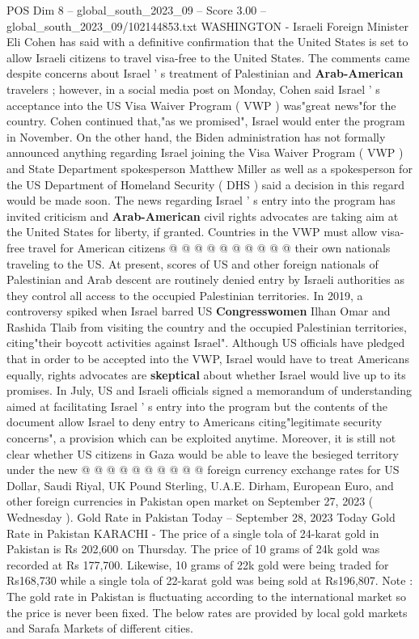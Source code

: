 \begin{textsample}{POS Dim 8 – global\_south\_2023\_09 – Score 3.00 – global\_south\_2023\_09/102144853.txt}  \label{ex:f8_pos_132}
WASHINGTON - Israeli Foreign Minister Eli Cohen has said with a definitive confirmation that the United States is set to allow Israeli citizens to travel visa-free to the United States.
The comments came despite concerns about Israel ' s treatment of Palestinian and \textbf{Arab-American} travelers ; however, in a social media post on Monday, Cohen said Israel ' s acceptance into the US Visa Waiver Program ( VWP ) was"great news"for the country.
Cohen continued that,"as we promised", Israel would enter the program in November.
On the other hand, the Biden administration has not formally announced anything regarding Israel joining the Visa Waiver Program ( VWP ) and State Department spokesperson Matthew Miller as well as a spokesperson for the US Department of Homeland Security ( DHS ) said a decision in this regard would be made soon.
The news regarding Israel ' s entry into the program has invited criticism and \textbf{Arab-American} civil rights advocates are taking aim at the United States for liberty, if granted.
Countries in the VWP must allow visa-free travel for American citizens @ @ @ @ @ @ @ @ @ @ their own nationals traveling to the US.
At present, scores of US and other foreign nationals of Palestinian and Arab descent are routinely denied entry by Israeli authorities as they control all access to the occupied Palestinian territories.
In 2019, a controversy spiked when Israel barred US \textbf{Congresswomen} Ilhan Omar and Rashida Tlaib from visiting the country and the occupied Palestinian territories, citing"their boycott activities against Israel".
Although US officials have pledged that in order to be accepted into the VWP, Israel would have to treat Americans equally, rights advocates are \textbf{skeptical} about whether Israel would live up to its promises.
In July, US and Israeli officials signed a memorandum of understanding aimed at facilitating Israel ' s entry into the program but the contents of the document allow Israel to deny entry to Americans citing"legitimate security concerns", a provision which can be exploited anytime.
Moreover, it is still not clear whether US citizens in Gaza would be able to leave the besieged territory under the new @ @ @ @ @ @ @ @ @ @ foreign currency exchange rates for US Dollar, Saudi Riyal, UK Pound Sterling, U.A.E.
Dirham, European Euro, and other foreign currencies in Pakistan open market on September 27, 2023 ( Wednesday ).
Gold Rate in Pakistan Today -- September 28, 2023 Today Gold Rate in Pakistan KARACHI - The price of a single tola of 24-karat gold in Pakistan is Rs 202,600 on Thursday.
The price of 10 grams of 24k gold was recorded at Rs 177,700.
Likewise, 10 grams of 22k gold were being traded for Rs168,730 while a single tola of 22-karat gold was being sold at Rs196,807.
Note : The gold rate in Pakistan is fluctuating according to the international market so the price is never been fixed.
The below rates are provided by local gold markets and Sarafa Markets of different cities.

\end{textsample}

